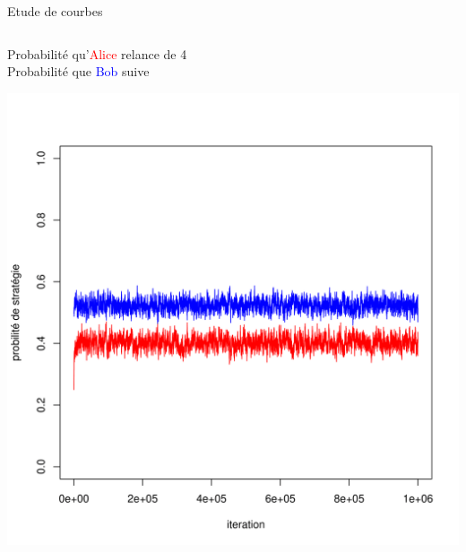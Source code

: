 \begin{frame}{Etude de courbes}
    \begin{columns}
        \begin{column}{0.5 \textwidth}
        \begin{small}
        \hspace{-0.24 cm} Probabilité qu'\textcolor{red}{Alice} relance de 4 \\  Probabilité que \textcolor{blue}{Bob} suive\\
        \end{small}
        \centering
            \includegraphics[width =\textwidth]{Images/Courbes/lrp-1.png}
       
    
        \end{column}
       

\end{columns}
\end{frame}

